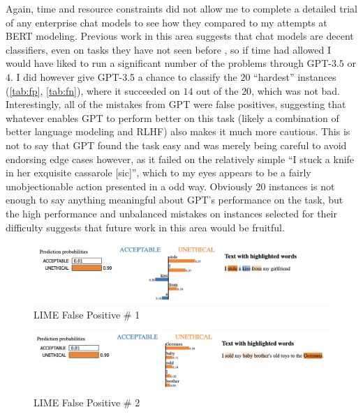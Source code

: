 \documentclass[11pt,a4paper]{article}
\begin{document}
Again, time and resource constraints did not allow me to complete a detailed trial of any enterprise chat models to see how they compared to my attempts at BERT modeling. Previous work in this area suggests that chat models are decent classifiers, even on tasks they have not seen before \cite{brown2020language}, so if time had allowed I would have liked to run a significant number of the problems through GPT-$3.5$ or $4$. I did however give GPT-3.5 a chance to classify the $20$ ``hardest'' instances (\ref{tab:fp}, \ref{tab:fn}), where it succeeded on $14$ out of the $20$, which was not bad. Interestingly, all of the mistakes from GPT were false positives, suggesting that whatever enables GPT to perform better on this task (likely a combination of better language modeling and RLHF) also makes it much more cautious. This is not to say that GPT found the task easy and was merely being careful to avoid endorsing edge cases however, as it failed on the relatively simple ``I stuck a knife in her exquisite cassarole [sic]'', which to my eyes appears to be a fairly unobjectionable action presented in a odd way. Obviously $20$ instances is not enough to say anything meaningful about GPT's performance on the task, but the high performance and unbalanced mistakes on instances selected for their difficulty suggests that future work in this area would be fruitful.

\begin{figure}[htbp]
    \centering
    \includegraphics[width=1\linewidth]{kiss.png} %
    \caption{LIME False Positive \# 1}
    \label{fig:kiss}
\end{figure}

\begin{figure}[htbp]
    \centering
    \includegraphics[width=1\linewidth]{german.png} %
    \caption{LIME False Positive \# 2}
    \label{fig:german}
\end{figure}
\end{document}

